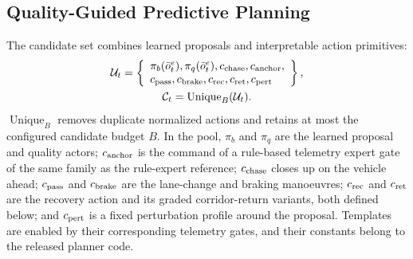 \documentclass[journal]{IEEEtran}
\begin{document}
\subsection{Quality-Guided Predictive Planning}
\label{subsec:planning}

The candidate set combines learned proposals and interpretable action
primitives:
\begin{equation}
\begin{gathered}
 \mathcal U_t=\left\{\begin{array}{l}
 \pi_b(\bar o_t^e),\pi_q(\bar o_t^e),c_{\rm chase},c_{\rm anchor},\\
 c_{\rm pass},c_{\rm brake},c_{\rm rec},c_{\rm ret},c_{\rm pert}
 \end{array}\right\},\\
 \mathcal C_t=\operatorname{Unique}_B(\mathcal U_t).
\end{gathered}
\label{eq:candidate_pool}
\end{equation}
$\operatorname{Unique}_B$ removes duplicate normalized actions and retains
at most the configured candidate budget $B$. In the pool, $\pi_b$ and $\pi_q$
are the learned proposal and quality actors; $c_{\rm anchor}$ is the command of
a rule-based telemetry expert gate of the same family as the rule-expert
reference; $c_{\rm chase}$ closes up on the vehicle ahead; $c_{\rm pass}$ and
$c_{\rm brake}$ are the lane-change and braking manoeuvres; $c_{\rm rec}$ and
$c_{\rm ret}$ are the recovery action and its graded corridor-return variants,
both defined below; and $c_{\rm pert}$ is a fixed perturbation profile around
the proposal. Templates are enabled by their corresponding telemetry gates, and
their constants belong to the released planner code.
\end{document}
